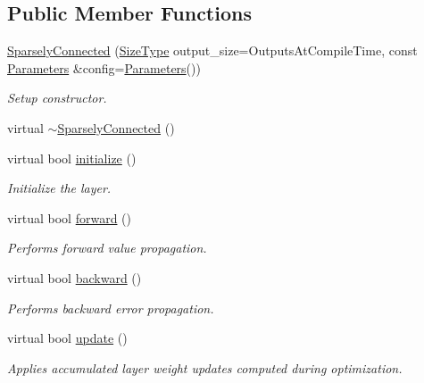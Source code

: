 \subsection*{Public Member Functions}
\begin{DoxyCompactItemize}
\item 
\hyperlink{classffnn_1_1layer_1_1_sparsely_connected_a7852f80fc620d79f893ca3a6ebea987b}{Sparsely\-Connected} (\hyperlink{classffnn_1_1layer_1_1internal_1_1_interface_af0567642f60c65b5e87067226a54174b}{Size\-Type} output\-\_\-size=Outputs\-At\-Compile\-Time, const \hyperlink{structffnn_1_1layer_1_1_sparsely_connected_1_1_parameters}{Parameters} \&config=\hyperlink{structffnn_1_1layer_1_1_sparsely_connected_1_1_parameters}{Parameters}())
\begin{DoxyCompactList}\small\item\em Setup constructor. \end{DoxyCompactList}\item 
virtual \hyperlink{classffnn_1_1layer_1_1_sparsely_connected_ab35a9206f553aa2c84c5d09d4472aed8}{$\sim$\-Sparsely\-Connected} ()
\item 
virtual bool \hyperlink{classffnn_1_1layer_1_1_sparsely_connected_abb2966b5e7813c43ae2ea5448188a9fb}{initialize} ()
\begin{DoxyCompactList}\small\item\em Initialize the layer. \end{DoxyCompactList}\item 
virtual bool \hyperlink{classffnn_1_1layer_1_1_sparsely_connected_a53f1d9a2edfdd2e47164b24121c23acc}{forward} ()
\begin{DoxyCompactList}\small\item\em Performs forward value propagation. \end{DoxyCompactList}\item 
virtual bool \hyperlink{classffnn_1_1layer_1_1_sparsely_connected_a597ea83c83e8f4f64a1fb7f17a1ea015}{backward} ()
\begin{DoxyCompactList}\small\item\em Performs backward error propagation. \end{DoxyCompactList}\item 
virtual bool \hyperlink{classffnn_1_1layer_1_1_sparsely_connected_afa564d528e74917231da2d038f76e3f1}{update} ()
\begin{DoxyCompactList}\small\item\em Applies accumulated layer weight updates computed during optimization. \end{DoxyCompactList}\item 

\end{DoxyCompactItemize}
